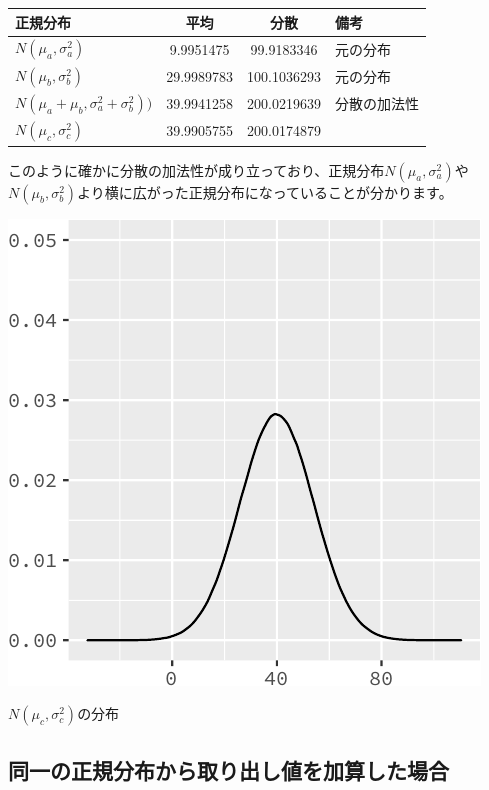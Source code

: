 \documentclass[]{tufte-handout}
\begin{document}
\begin{longtable}[]{@{}lccl@{}}
\toprule
正規分布 & 平均 & 分散 & 備考 \\
\midrule
\endhead
\(N(\mu_a, \sigma^2_a)\) & 9.9951475 & 99.9183346 & 元の分布 \\
\(N(\mu_b, \sigma^2_b)\) & 29.9989783 & 100.1036293 & 元の分布 \\
\(N(\mu_a + \mu_b, \sigma^2_a + \sigma^2_b))\) & 39.9941258 &
200.0219639 & 分散の加法性 \\
\(N(\mu_c, \sigma^2_c)\) & 39.9905755 & 200.0174879 & \\
\bottomrule
\end{longtable}

このように確かに分散の加法性が成り立っており、正規分布\(N(\mu_a, \sigma^2_a)\)や\(N(\mu_b,\sigma^2_b)\)より横に広がった正規分布になっていることが分かります。

\begin{marginfigure}

{\centering \includegraphics{AdditivityOfVariance_files/figure-latex/unnamed-chunk-5-1} 

}

\caption[$N(\mu_c, \sigma^2_c)$の分布]{$N(\mu_c, \sigma^2_c)$の分布}\label{fig:unnamed-chunk-5}
\end{marginfigure}

\newpage

\hypertarget{ux540cux4e00ux306eux6b63ux898fux5206ux5e03ux304bux3089ux53d6ux308aux51faux3057ux5024ux3092ux52a0ux7b97ux3057ux305fux5834ux5408}{%
\subsection{\texorpdfstring{\textbf{同一の正規分布から取り出し値を加算した場合}}{同一の正規分布から取り出し値を加算した場合}}\label{ux540cux4e00ux306eux6b63ux898fux5206ux5e03ux304bux3089ux53d6ux308aux51faux3057ux5024ux3092ux52a0ux7b97ux3057ux305fux5834ux5408}}
\end{document}
